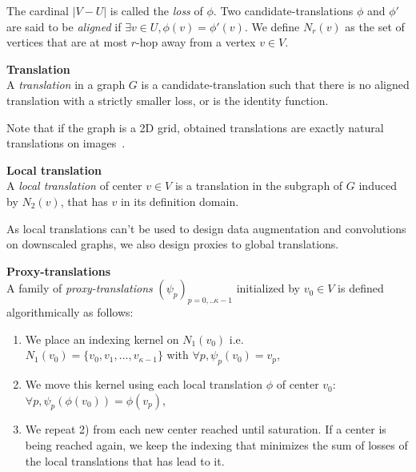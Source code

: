 The cardinal $|V-U|$ is called the \emph{loss} of $\phi$.
Two candidate-translations $\phi$ and $\phi'$ are said to be \emph{aligned} if $\exists v\in U, \phi(v) = \phi'(v)$.
We define $N_r(v)$ as the set of vertices that are at most $r$-hop away from a vertex $v \in V$.\\

\begin{definition}{\textbf{Translation}}\\
  A \emph{translation} in a graph $G$ is a candidate-translation such that there is no aligned translation with a strictly smaller loss, or is the identity function.\\
\end{definition}

Note that if the graph is a 2D grid, obtained translations are exactly natural translations on images~\cite{GrePasViaGri201610}.\\

\begin{definition}{\textbf{Local translation}}\\
A \emph{local translation} of center $v \in V$ is a translation in the subgraph of $G$ induced by $N_2(v)$, that has $v$ in its definition domain.\\
\end{definition}

As local translations can't be used to design data augmentation and convolutions on downscaled graphs, we also design proxies to global translations.\\

\begin{definition}{\textbf{Proxy-translations}}\\
A family of \emph{proxy-translations} $(\psi_p)_{p=0,..\kappa-1}$ initialized by $v_0 \in V$ is defined algorithmically as follows:
\begin{enumerate}
\item We place an indexing kernel on $N_1(v_0) $ i.e.\\ $N_1(v_0) = \{v_0, v_1, ..., v_{\kappa-1}\}$ with $\forall p, \psi_p(v_0) = v_p$,
\item We move this kernel using each local translation $\phi$ of center $v_0$: $\forall p, \psi_p(\phi(v_0)) = \phi(v_p)$,
\item We repeat 2) from each new center reached until saturation. If a center is being reached again, we keep the indexing that minimizes the sum of losses of the local translations that has lead to it.
\end{enumerate}
\end{definition}

